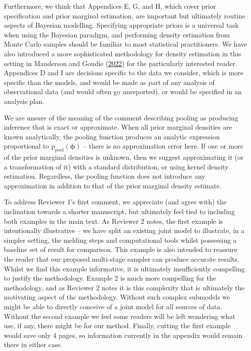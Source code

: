 \documentclass[
  10pt,
  a4paper,
]{article}
\newcommand{\pd}{\text{p}}
\begin{document}
Furthermore, we think that Appendices E, G, and H, which cover prior
specification and prior marginal estimation, are important but
ultimately routine aspects of Bayesian modelling. Specifying appropriate
priors is a universal task when using the Bayesian paradigm, and
performing density estimation from Monte Carlo samples should be
familiar to most statistical practitioners. We have also introduced a
more sophisticated methodology for density estimation in this setting in
Manderson and Goudie
(\protect\hyperlink{ref-manderson_numerically_2022}{2022}) for the
particularly interested reader. Appendices D and I are decisions
specific to the data we consider, which is more specific than the
models, and would be made as part of any analysis of observational data
(and would often go unreported), or would be specified in an analysis
plan.

We are unsure of the meaning of the comment describing pooling as
producing inference that is exact or approximate. When all prior
marginal densities are known analytically, the pooling function produces
an analytic expression proportional to
\(\pd_{\text{pool}}(\boldsymbol{\phi})\) -- there is no approximation
error here. If one or more of the prior marginal densities is unknown,
then we suggest approximating it (or a transformation of it) with a
standard distribution, or using kernel density estimation. Regardless,
the pooling function does not introduce any approximation in addition to
that of the prior marginal density estimate.

To address Reviewer 1's first comment, we appreciate (and agree with)
the inclination towards a shorter manuscript, but ultimately feel tied
to including both examples in the main text. As Reviewer 2 notes, the
first example is intentionally illustrative -- we have split an existing
joint model to illustrate, in a simpler setting, the melding steps and
computational tools whilst possessing a baseline set of result for
comparison. This example is also intended to reassure the reader that
our proposed multi-stage sampler can produce accurate results. Whilst we
find this example informative, it is ultimately insufficiently
compelling to justify the methodology. Example 2 is much more compelling
for the methodology, and as Reviewer 2 notes it is this complexity that
is ultimately the motivating aspect of the methodology. Without such
complex submodels we might be able to directly conceive of a joint model
for all sources of data. Without the second example we feel some readers
will be left wondering what use, if any, there might be for our method.
Finally, cutting the first example would save only 4 pages, so
information currently in the appendix would remain there in either case.
\end{document}

